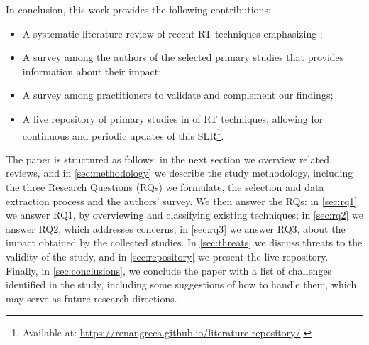 In conclusion, this work provides the following contributions:
\begin{itemize}
	\item A systematic literature review of recent RT techniques  emphasizing \rea;
	\item A survey among the authors of the selected primary studies that provides information about their impact;
	\item A survey among practitioners to validate and complement our findings;
	\item A live repository of primary studies in \rea of RT techniques, allowing for continuous and periodic updates of this SLR\footnote{Available at: \url{https://renangreca.github.io/literature-repository/}.}.
\end{itemize}

The paper is structured as follows: 
in the next section we  overview related reviews, and
in \autoref{sec:methodology} we describe the study methodology, including the three Research Questions (RQs) we formulate, the selection and data extraction process and the authors' survey.
We then answer the RQs: 
in \autoref{sec:rq1} we answer RQ1, by overviewing and classifying existing techniques;
in \autoref{sec:rq2} we answer RQ2, which addresses \rea concerns; 
in \autoref{sec:rq3} we answer RQ3, about the impact obtained by the collected studies.
In \autoref{sec:threats} we discuss threats to the validity of the study, and
in \autoref{sec:repository} we present the live repository.
Finally, in \autoref{sec:conclusions}, we 
conclude the paper with a list of challenges identified in the study, including some suggestions of how to handle them, which may serve as future research directions.
